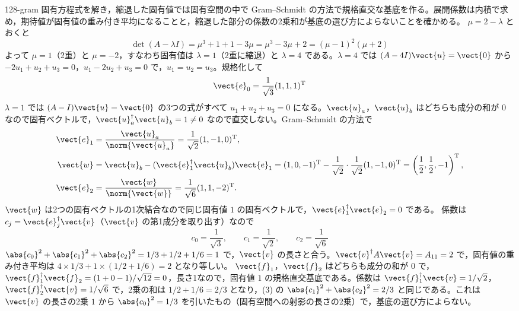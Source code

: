 \documentclass[uplatex,dvipdfmx,a4paper,11pt]{jsarticle}
\begin{document}
\begin{kaisetsu}{128-gram}
\houshin 固有方程式を解き，縮退した固有値では固有空間の中で Gram--Schmidt の方法で規格直交な基底を作る。展開係数は内積で求め，期待値が固有値の重み付き平均になることと，縮退した部分の係数の2乗和が基底の選び方によらないことを確かめる。
\keisan
{} $\mu=2-\lambda$ とおくと
\[ \det(A-\lambda I)=\mu^{3}+1+1-3\mu=\mu^{3}-3\mu+2=(\mu-1)^{2}(\mu+2) \]
よって $\mu=1$（2重）と $\mu=-2$，すなわち固有値は $\lambda=1$（2重に縮退）と $\lambda=4$ である。$\lambda=4$ では $(A-4I)\vect{u}=\vect{0}$ から $-2u_{1}+u_{2}+u_{3}=0$，$u_{1}-2u_{2}+u_{3}=0$ で，$u_{1}=u_{2}=u_{3}$。規格化して
\[ \vect{e}_{0}=\frac{1}{\sqrt{3}}(1,1,1)^{\mathrm{T}} \]
 $\lambda=1$ では $(A-I)\vect{u}=\vect{0}$ の3つの式がすべて $u_{1}+u_{2}+u_{3}=0$ になる。$\vect{u}_{a}$，$\vect{u}_{b}$ はどちらも成分の和が $0$ なので固有ベクトルで，$\vect{u}_{a}^{\dagger}\vect{u}_{b}=1\neq0$ なので直交しない。Gram--Schmidt の方法で
\begin{align*}
  \vect{e}_{1}&=\frac{\vect{u}_{a}}{\norm{\vect{u}_{a}}}=\frac{1}{\sqrt{2}}(1,-1,0)^{\mathrm{T}},\\
  \vect{w}&=\vect{u}_{b}-(\vect{e}_{1}^{\dagger}\vect{u}_{b})\vect{e}_{1}=(1,0,-1)^{\mathrm{T}}-\frac{1}{\sqrt{2}}\cdot\frac{1}{\sqrt{2}}(1,-1,0)^{\mathrm{T}}=\left(\frac{1}{2},\frac{1}{2},-1\right)^{\mathrm{T}},\\
  \vect{e}_{2}&=\frac{\vect{w}}{\norm{\vect{w}}}=\frac{1}{\sqrt{6}}(1,1,-2)^{\mathrm{T}}.
\end{align*}
$\vect{w}$ は2つの固有ベクトルの1次結合なので同じ固有値 $1$ の固有ベクトルで，$\vect{e}_{1}^{\dagger}\vect{e}_{2}=0$ である。
 係数は $c_{j}=\vect{e}_{j}^{\dagger}\vect{v}$（$\vect{v}$ の第1成分を取り出す）なので
\[ c_{0}=\frac{1}{\sqrt{3}},\qquad c_{1}=\frac{1}{\sqrt{2}},\qquad c_{2}=\frac{1}{\sqrt{6}} \]
$\abs{c_{0}}^{2}+\abs{c_{1}}^{2}+\abs{c_{2}}^{2}=1/3+1/2+1/6=1$ で，$\vect{v}$ の長さと合う。$\vect{v}^{\dagger}A\vect{v}=A_{11}=2$ で，固有値の重み付き平均は $4\times1/3+1\times(1/2+1/6)=2$ となり等しい。
 $\vect{f}_{1}$，$\vect{f}_{2}$ はどちらも成分の和が $0$ で，$\vect{f}_{1}^{\dagger}\vect{f}_{2}=(1+0-1)/\sqrt{12}=0$，長さ1なので，固有値 $1$ の規格直交基底である。係数は $\vect{f}_{1}^{\dagger}\vect{v}=1/\sqrt{2}$，$\vect{f}_{2}^{\dagger}\vect{v}=1/\sqrt{6}$ で，2乗の和は $1/2+1/6=2/3$ となり，(3) の $\abs{c_{1}}^{2}+\abs{c_{2}}^{2}=2/3$ と同じである。これは $\vect{v}$ の長さの2乗 $1$ から $\abs{c_{0}}^{2}=1/3$ を引いたもの（固有空間への射影の長さの2乗）で，基底の選び方によらない。

\end{kaisetsu}
\end{document}

